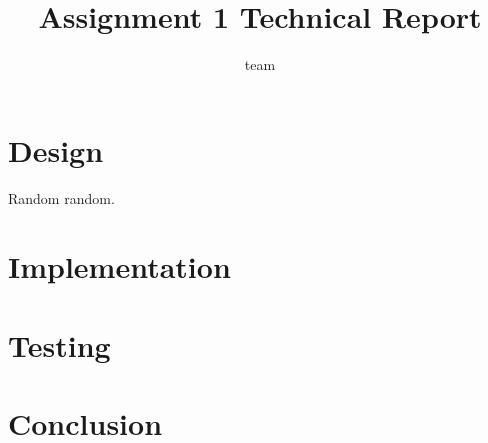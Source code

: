 \documentclass{report}
\title{Assignment 1 Technical Report}
\author{team}
\date{}
\begin{document}
\maketitle
\tableofcontents






\chapter{Design}
Random random.
\chapter{Implementation}
\chapter{Testing}
\chapter{Conclusion}



\end{document}
